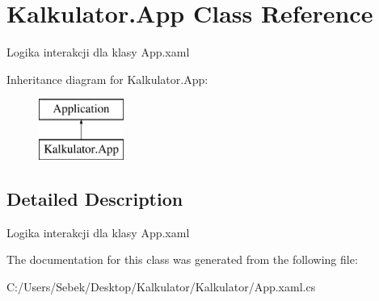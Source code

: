 \hypertarget{class_kalkulator_1_1_app}{}\section{Kalkulator.\+App Class Reference}
\label{class_kalkulator_1_1_app}


Logika interakcji dla klasy App.\+xaml  


Inheritance diagram for Kalkulator.\+App\+:\begin{figure}[H]
\begin{center}
\leavevmode
\includegraphics[height=2.000000cm]{class_kalkulator_1_1_app}
\end{center}
\end{figure}


\subsection{Detailed Description}
Logika interakcji dla klasy App.\+xaml 



The documentation for this class was generated from the following file\+:\begin{DoxyCompactItemize}
\item 
C\+:/\+Users/\+Sebek/\+Desktop/\+Kalkulator/\+Kalkulator/App.\+xaml.\+cs\end{DoxyCompactItemize}
